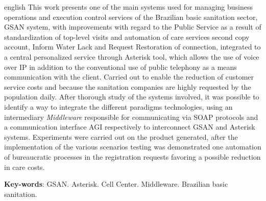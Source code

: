 \begin{resumo}[Abstract]
 \begin{otherlanguage*}{english}
This work presents one of the main systems used for managing business operations and execution control services of the Brazilian basic sanitation sector, GSAN system, with improvements with regard to the Public Service as a result of standardization of top-level visits and automation of care services second copy account, Inform Water Lack and Request Restoration of connection, integrated to a central personalized service through Asterisk tool, which allows the use of voice over IP in addition to the conventional use of public telephony as a means communication with the client. Carried out to enable the reduction of customer service costs and because the sanitation companies are highly requested by the population daily. After thorough study of the systems involved, it was possible to identify a way to integrate the different paradigms technologies, using an intermediary \textit{Middleware} responsible for communicating via SOAP protocols and a communication interface AGI respectively to interconnect GSAN and Asterisk systems. Experiments were carried out on the product generated, after the implementation of the various scenarios testing was demonstrated one automation of bureaucratic processes in the registration requests favoring a possible reduction in care costs.

   \vspace{\onelineskip}
 
   \noindent 
   \textbf{Key-words}: GSAN. Asterisk. Cell Center. Middleware. Brazilian basic sanitation.
 \end{otherlanguage*}
\end{resumo}